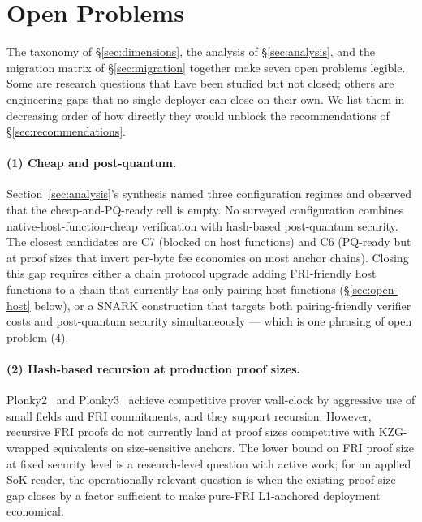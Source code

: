 \section{Open Problems}
\label{sec:open}

The taxonomy of \S\ref{sec:dimensions}, the analysis of
\S\ref{sec:analysis}, and the migration matrix of
\S\ref{sec:migration} together make seven open problems legible. Some
are research questions that have been studied but not closed; others
are engineering gaps that no single deployer can close on their own.
We list them in decreasing order of how directly they would
unblock the recommendations of \S\ref{sec:recommendations}.

\paragraph{(1) Cheap and post-quantum.} Section~\ref{sec:analysis}'s
synthesis named three configuration regimes and observed that the
cheap-and-PQ-ready cell is empty. No surveyed configuration combines
native-host-function-cheap verification with hash-based
post-quantum security. The closest candidates are C7 (blocked on
host functions) and C6 (PQ-ready but at proof sizes that invert
per-byte fee economics on most anchor chains). Closing this gap
requires either a chain protocol upgrade adding FRI-friendly host
functions to a chain that currently has only pairing host functions
(\S\ref{sec:open-host} below), or a SNARK construction that targets
both pairing-friendly verifier costs and post-quantum security
simultaneously --- which is one phrasing of open problem (4).

\paragraph{(2) Hash-based recursion at production proof
sizes.} Plonky2~\cite{plonky2-2022} and
Plonky3~\cite{plonky3-spec} achieve competitive prover wall-clock by
aggressive use of small fields and FRI commitments, and they support
recursion. However, recursive FRI proofs do not currently land at
proof sizes competitive with KZG-wrapped equivalents on
size-sensitive anchors. The lower bound on FRI proof size at fixed
security level is a research-level question with active
work; for an applied SoK reader, the operationally-relevant
question is when the existing proof-size gap closes by a factor
sufficient to make pure-FRI L1-anchored deployment economical.

